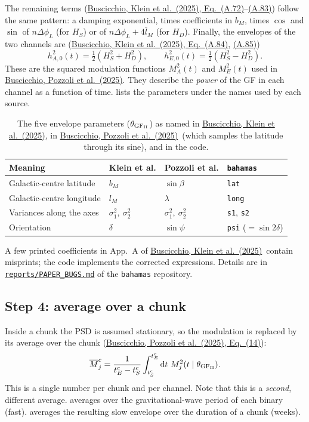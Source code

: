 \documentclass[11pt,a4paper]{article}
\newcommand{\urlPone}{https://arxiv.org/pdf/2511.03604}
\newcommand{\urlPtwo}{https://arxiv.org/pdf/2410.08263}
\newcommand{\Pone}{\href{\urlPone}{Buscicchio, Pozzoli et al.~(2025)}}
\newcommand{\Ptwo}{\href{\urlPtwo}{Buscicchio, Klein et al.~(2025)}}
\newcommand{\PoneEq}[1]{\href{\urlPone}{Buscicchio, Pozzoli et al.~(2025), Eq.~(#1)}}
\newcommand{\PtwoEq}[1]{\href{\urlPtwo}{Buscicchio, Klein et al.~(2025), Eq.~(#1)}}
\newcommand{\dd}{\mathrm{d}}
\newcommand{\Mbar}{\overline{M}}
\begin{document}
The remaining terms (\PtwoEq{A.72}--\href{\urlPtwo}{(A.83)}) follow the same pattern:
a damping exponential, times coefficients in $b_M$, times $\cos$ and $\sin$ of
$n\Delta\phi_L$ (for $H_S$) or of $n\Delta\phi_L+4\bar l_M$ (for $H_D$). Finally, the
envelopes of the two channels are (\PtwoEq{A.84}, \href{\urlPtwo}{(A.85)})
\begin{equation}
  \boxed{\ h^2_{A,0}(t) = \tfrac12\left(H_S^2 + H_D^2\right),\qquad
          h^2_{E,0}(t) = \tfrac12\left(H_S^2 - H_D^2\right).\ }
  \label{eq:AE}
\end{equation}
These are the squared modulation functions $M_A^2(t)$ and $M_E^2(t)$ used in \Pone.
They describe the \emph{power} of the GF in each channel as a function of time.
 lists the parameters under the names used by each source.

\begin{table}[h]
\centering
\begin{tabular}{@{}llll@{}}
\toprule
Meaning & Klein et al. & Pozzoli et al. & \texttt{bahamas} \\
\midrule
Galactic-centre latitude  & $b_M$ & $\sin\beta$ & \texttt{lat} \\
Galactic-centre longitude & $l_M$ & $\lambda$ & \texttt{long} \\
Variances along the axes  & $\sigma_1^2,\ \sigma_2^2$ & $\sigma_1^2,\ \sigma_2^2$ & \texttt{s1}, \texttt{s2} \\
Orientation               & $\delta$ & $\sin\psi$ & \texttt{psi} ($=\sin2\delta$) \\
\bottomrule
\end{tabular}
\caption{The five envelope parameters ($\theta_{\rm GF_{II}}$) as named in \Ptwo, in \Pone\ (which samples the latitude through its sine), and in the code.}
\label{tab:params}
\end{table}

\noindent
A few printed coefficients in App.~A of \Ptwo\ contain misprints; the code implements
the corrected expressions. Details are in
\href{https://github.com/shrikrishnaanand/bahamas_ska/blob/ska_branch/reports/PAPER_BUGS.md}{\texttt{reports/PAPER\_BUGS.md}} of the \texttt{bahamas} repository.

\subsection{Step 4: average over a chunk}

Inside a chunk the PSD is assumed stationary, so the modulation is replaced by its
average over the chunk (\PoneEq{14}):
\begin{equation}
  \Mbar^c_j = \frac{1}{t^c_E-t^c_S}\int_{t^c_S}^{t^c_E}\dd t\ M_j^2(t\mid\theta_{\rm GF_{II}}).
  \label{eq:mbar}
\end{equation}
This is a single number per chunk and per channel. Note that this is a \emph{second},
different average.  averages over the gravitational-wave period of
each binary (fast).  averages the resulting slow envelope over the
duration of a chunk (weeks).
\end{document}
